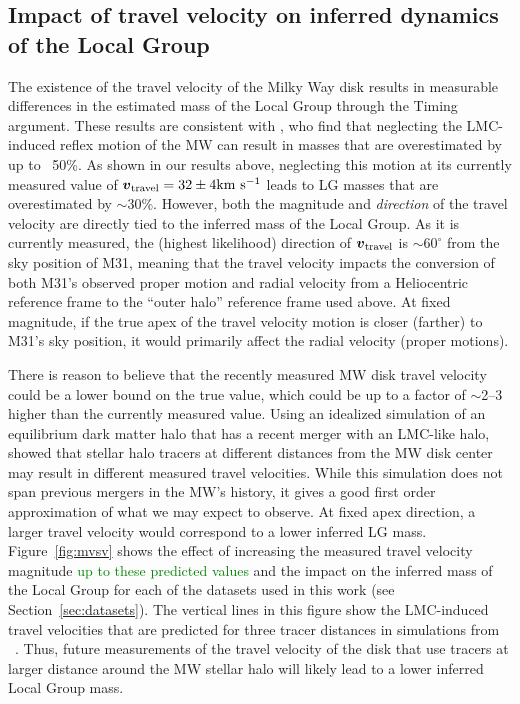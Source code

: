 \documentclass[twocolumn]{aastex631}
\newcommand{\add}[1]{\textcolor{green}{#1}}
\newcommand{\bov}{\ensuremath{\boldsymbol{v}}}
\newcommand{\vtrav}{\ensuremath{\bov_{\rm travel}}}
\begin{document}
\subsection{Impact of travel velocity on inferred dynamics of the Local Group}
\label{sec:discussion-impact}
The existence of the travel velocity of the Milky Way disk
results in measurable differences in the estimated mass of the Local Group
through the Timing argument.
These results are consistent with \cite{Erkal2020}, who find that neglecting the
LMC-induced reflex motion of the MW can result in masses that are overestimated
by up to ~50\%.
As shown in our results above, neglecting this motion at its currently measured
value of $\vtrav=32\pm4\kms$
\citep{Petersen2021} leads to LG masses that are overestimated by $\sim30\%$.
However, both the magnitude and \emph{direction} of the travel velocity are
directly tied to the inferred mass of the Local Group.
As it is currently measured, the (highest likelihood) direction of $\vtrav$
is $\sim$$60^\circ$ from the sky position of M31, meaning that the travel
velocity impacts the conversion of both M31's observed proper motion and radial
velocity from a Heliocentric reference frame to the ``outer halo'' reference
frame used above.
At fixed magnitude, if the true apex of the travel velocity motion is closer
(farther) to M31's sky position, it would primarily affect the radial velocity
(proper motions).

There is reason to believe that the recently measured MW disk travel velocity
could be a lower bound on the true value, which could be up to a factor of
$\sim$2--3 higher than the currently measured value.
Using an idealized simulation of an equilibrium dark matter halo that has a
recent merger with an LMC-like halo, \cite{Garavito-Camargo2021b} showed that
stellar halo tracers at different distances from the MW disk center may result
in different measured travel velocities.
While this simulation does not span previous mergers in the MW's history, it
gives a good first order approximation of what we may expect to observe.
At fixed apex direction, a larger travel velocity would correspond to a lower
inferred LG mass.
Figure~\ref{fig:mvsv} shows the effect of increasing the measured travel
velocity magnitude \add{up to these predicted values} and the impact on the
inferred mass of the Local Group for
each of the datasets used in this work (see Section~\ref{sec:datasets}).
The vertical lines in this figure show the LMC-induced travel velocities that
are predicted for three tracer distances in simulations from
~\cite{Garavito-Camargo2021b}.
Thus, future measurements of the travel velocity of the disk that use tracers at
larger distance around the MW stellar halo will likely lead to a lower inferred
Local Group mass.
\end{document}

